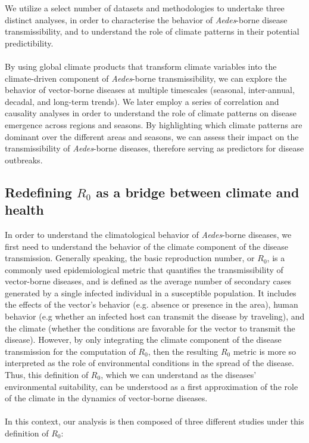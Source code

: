 \documentclass[article,10pt,twocolumn]{wlscirep}
\begin{document}
We utilize a select number of datasets and methodologies to undertake three distinct analyses, in order to characterise the behavior of \textit{Aedes}-borne disease transmissibility, and to understand the role of climate patterns in their potential predictibility.
\\
\\
By using global climate products that transform climate variables into the climate-driven component of \textit{Aedes}-borne transmissibility, we can explore the behavior of vector-borne diseases at multiple timescales (seasonal, inter-annual, decadal, and long-term trends). We later employ a series of correlation and causality analyses in order to understand the role of climate patterns on disease emergence across regions and seasons. By highlighting which climate patterns are dominant over the different areas and seasons, we can assess their impact on the transmissibility of \textit{Aedes}-borne diseases, therefore serving as predictors for disease outbreaks.

\subsection{Redefining $R_0$ as a bridge between climate and health} \label{sec-methods-redefining-R0}

In order to understand the climatological behavior of \textit{Aedes}-borne diseases, we first need to understand the behavior of the climate component of the disease transmission. Generally speaking, the basic reproduction number, or $R_0$, is a commonly used epidemiological metric that quantifies the transmissibility of vector-borne diseases, and is defined as the average number of secondary cases generated by a single infected individual in a susceptible population. It includes the effects of the vector's behavior (e.g. absence or presence in the area), human behavior (e.g whether an infected host can transmit the disease by traveling), and the climate (whether the conditions are favorable for the vector to transmit the disease). However, by only integrating the climate component of the disease transmission for the computation of $R_0$, then the resulting $R_0$ metric is more so interpreted as the role of environmental conditions in the spread of the disease. Thus, this definition of $R_0$, which we can understand as the diseases' environmental suitability, can be understood as a first approximation of the role of the climate in the dynamics of vector-borne diseases.
\\
\\
In this context, our analysis is then composed of three different studies under this definition of $R_0$:
\end{document}
